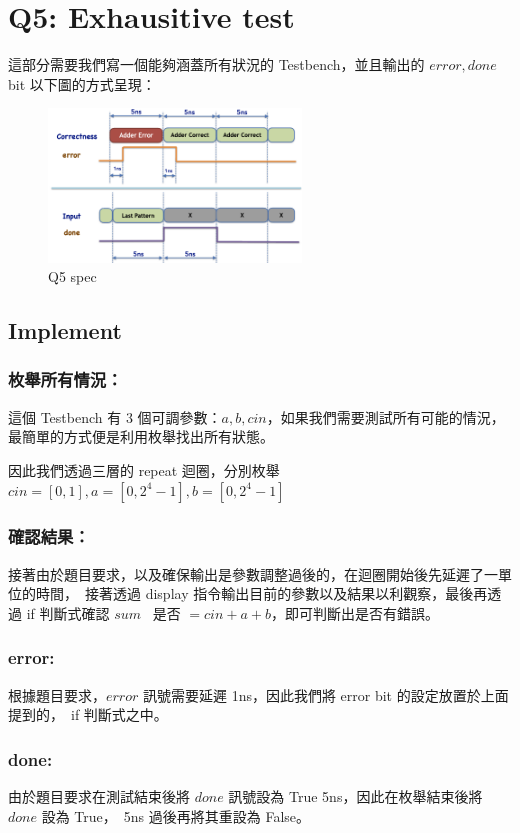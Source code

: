 \documentclass[10.5pt,compsoc,UTF8]{CjC}
\theoremstyle{mystyle}
\begin{document}
\newpage

\section{Q5: Exhausitive test}
這部分需要我們寫一個能夠涵蓋所有狀況的 Testbench，並且輸出的 $error, done$ bit 以下圖的方式呈現：
\begin{figure}[h]
  \centering
  \includegraphics[width=0.6\textwidth]{Q5-spec.png}
  \caption{Q5 spec}
\end{figure}

\newpage
\subsection{Implement}
\subsubsection*{枚舉所有情況：}
這個 Testbench 有 3 個可調參數：$a, b, cin$，如果我們需要測試所有可能的情況，最簡單的方式便是利用枚舉找出所有狀態。
\par
因此我們透過三層的 repeat 迴圈，分別枚舉 $cin = [0, 1], a = [0, 2^4-1], b = [0, 2^4 - 1]$\ 

\subsubsection*{確認結果：}
接著由於題目要求，以及確保輸出是參數調整過後的，在迴圈開始後先延遲了一單位的時間，\
接著透過 display 指令輸出目前的參數以及結果以利觀察，最後再透過 if 判斷式確認 $sum$ \
是否 $= cin + a + b$，即可判斷出是否有錯誤。

\subsubsection*{error:}
根據題目要求，$error$ 訊號需要延遲 1ns，因此我們將 error bit 的設定放置於上面提到的，\
if 判斷式之中。

\subsubsection*{done:}
由於題目要求在測試結束後將 $done$ 訊號設為 True 5ns，因此在枚舉結束後將 $done$ 設為 True，\
5ns 過後再將其重設為 False。
\end{document}

